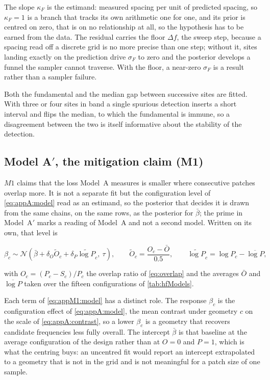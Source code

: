 The slope $\kappa_F$ is the estimand: measured spacing per unit of predicted spacing, so $\kappa_F=1$ is a branch that tracks its own arithmetic one for one, and its prior is centred on zero, that is on no relationship at all, so the hypothesis has to be earned from the data. The residual carries the floor $\Delta f$, the sweep step, because a spacing read off a discrete grid is no more precise than one step; without it, sites landing exactly on the prediction drive $\sigma_F$ to zero and the posterior develops a funnel the sampler cannot traverse. With the floor, a near-zero $\sigma_F$ is a result rather than a sampler failure.

Both the fundamental and the median gap between successive sites are fitted. With three or four sites in band a single spurious detection inserts a short interval and flips the median, to which the fundamental is immune, so a disagreement between the two is itself informative about the stability of the detection.

\subsection{\texorpdfstring{Model A$'$}{Model A'}, the mitigation claim (M1)}

$M1$ claims that the loss Model~A measures is smaller where consecutive patches overlap more. It is not a separate fit but the configuration level of \autoref{eq:appA:model} read as an estimand, so the posterior that decides it is drawn from the same chains, on the same rows, as the posterior for $\bar\beta$; the prime in Model~A$'$ marks a reading of Model~A and not a second model. Written on its own, that level is

\begin{equation}
\label{eq:appM1:model}
\beta_c \sim \mathcal{N}\!\left(\bar\beta + \delta_O \widetilde O_c + \delta_P \widetilde{\log P}_c,\ \tau\right),
\qquad
\widetilde O_c=\frac{O_c-\bar O}{0.5},
\qquad
\widetilde{\log P}_c=\log P_c-\overline{\log P},
\end{equation}

with $O_c=(P_c-S_c)/P_c$ the overlap ratio of \autoref{eq:overlap} and the averages $\bar O$ and $\overline{\log P}$ taken over the fifteen configurations of \autoref{tab:hfModels}.

Each term of \autoref{eq:appM1:model} has a distinct role. The response $\beta_c$ is the configuration effect of \autoref{eq:appA:model}, the mean contrast under geometry $c$ on the scale of \autoref{eq:appA:contrast}, so a lower $\beta_c$ is a geometry that recovers candidate frequencies less fully overall. The intercept $\bar\beta$ is that baseline at the average configuration of the design rather than at $O=0$ and $P=1$, which is what the centring buys: an uncentred fit would report an intercept extrapolated to a geometry that is not in the grid and is not meaningful for a patch size of one sample.

